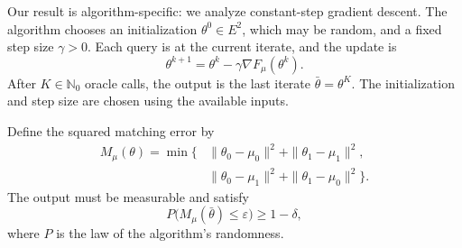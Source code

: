 \documentclass[10pt]{article}
\theoremstyle{definition}
\begin{document}
Our result is algorithm-specific: we analyze constant-step gradient descent. The algorithm chooses an initialization $\theta^0\in E^2$, which may be random, and a fixed step size $\gamma>0$. Each query is at the current iterate, and the update is
\[
\theta^{k+1}=\theta^k-\gamma\nabla F_\mu(\theta^k).
\]
After $K\in\mathbb{N}_0$ oracle calls, the output is the last iterate $\bar{\theta}=\theta^K$. The initialization and step size are chosen using the available inputs.

Define the squared matching error by
\[
\begin{aligned}
M_\mu(\theta)=\min\bigl\{
&\|\theta_0-\mu_0\|^2+\|\theta_1-\mu_1\|^2,\\
&\|\theta_0-\mu_1\|^2+\|\theta_1-\mu_0\|^2
\bigr\}.
\end{aligned}
\]
The output must be measurable and satisfy
\[
P\bigl(M_\mu(\bar{\theta})\leq\varepsilon\bigr)\geq1-\delta,
\]
where $P$ is the law of the algorithm's randomness.
\end{document}
